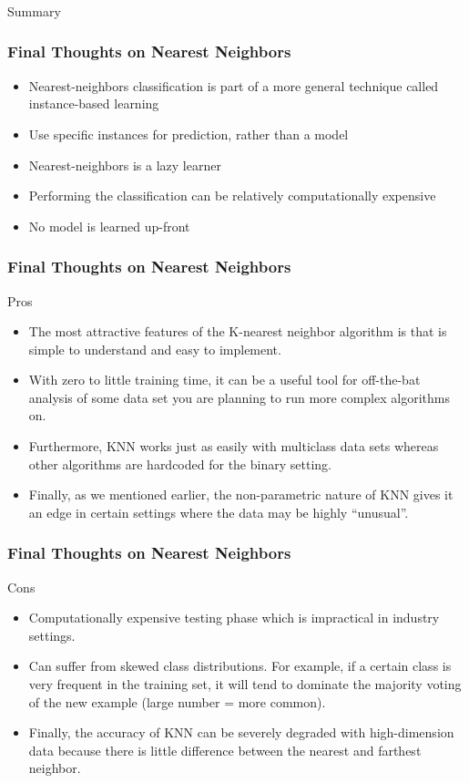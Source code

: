 \begin{frame}[fragile]\frametitle{}
\begin{center}
{\Large Summary}
\end{center}
\end{frame}

\begin{frame}[fragile]\frametitle{Final Thoughts on Nearest Neighbors}
\begin{itemize}
\item Nearest-neighbors classification is part of a more general technique called instance-based learning
\item Use specific instances for prediction, rather than a model
\item Nearest-neighbors is a lazy learner
\item Performing the classification can be relatively computationally expensive
\item No model is learned up-front
\end{itemize}
\end{frame}

\begin{frame}[fragile]\frametitle{Final Thoughts on Nearest Neighbors}
Pros
\begin{itemize}
\item The most attractive features of the K-nearest neighbor algorithm is that is simple to understand and easy to implement. 
\item With zero to little training time, it can be a useful tool for off-the-bat analysis of some data set you are planning to run more complex algorithms on. 
\item Furthermore, KNN works just as easily with multiclass data sets whereas other algorithms are hardcoded for the binary setting. 
\item Finally, as we mentioned earlier, the non-parametric nature of KNN gives it an edge in certain settings where the data may be highly ``unusual''.
\end{itemize}
\end{frame}

\begin{frame}[fragile]\frametitle{Final Thoughts on Nearest Neighbors}
Cons
\begin{itemize}
\item Computationally expensive testing phase which is impractical in industry settings. 
\item Can suffer from skewed class distributions. For example, if a certain class is very frequent in the training set, it will tend to dominate the majority voting of the new example (large number = more common). 
\item Finally, the accuracy of KNN can be severely degraded with high-dimension data because there is little difference between the nearest and farthest neighbor.
\end{itemize}
\end{frame}


